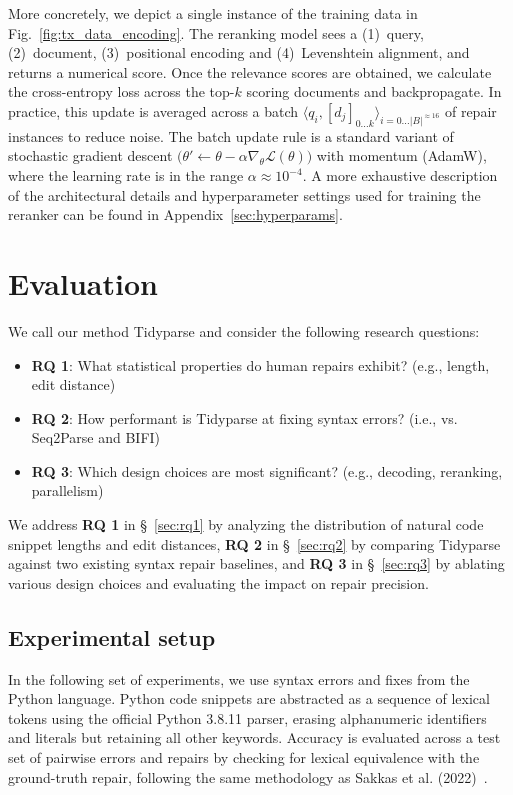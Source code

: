 \documentclass[sigplan,review,acmsmall,nonacm,screen,anonymous]{acmart}\settopmatter{printfolios=false,printccs=false,printacmref=false}
\begin{document}
More concretely, we depict a single instance of the training data in Fig.~\ref{fig:tx_data_encoding}. The reranking model sees a (1)~query, (2)~document, (3)~positional encoding and (4)~Levenshtein alignment, and returns a numerical score. Once the relevance scores are obtained, we calculate the cross-entropy loss across the top-$k$ scoring documents and backpropagate. In practice, this update is averaged across a batch $\langle q_i, [d_j]_{0\ldots k}\rangle_{i=0\ldots |B|^{\approx 16}}$ of repair instances to reduce noise. The batch update rule is a standard variant of stochastic gradient descent $\big(\theta' \leftarrow \theta - \alpha \nabla_{\theta} \mathcal{L}(\theta)\big)$ with momentum (AdamW), where the learning rate is in the range $\alpha\approx10^{-4}$. A more exhaustive description of the architectural details and hyperparameter settings used for training the reranker can be found in Appendix~\ref{sec:hyperparams}.

\clearpage\section{Evaluation}

We call our method Tidyparse and consider the following research questions:

\begin{itemize}
\item \textbf{RQ 1}: What statistical properties do human repairs exhibit? (e.g., length, edit distance)
\item \textbf{RQ 2}: How performant is Tidyparse at fixing syntax errors? (i.e., vs. Seq2Parse and BIFI)
\item \textbf{RQ 3}: Which design choices are most significant? (e.g., decoding, reranking, parallelism)
\end{itemize}

We address \textbf{RQ 1} in \S~\ref{sec:rq1} by analyzing the distribution of natural code snippet lengths and edit distances, \textbf{RQ 2} in \S~\ref{sec:rq2} by comparing Tidyparse against two existing syntax repair baselines, and \textbf{RQ 3} in \S~\ref{sec:rq3} by ablating various design choices and evaluating the impact on repair precision.

\subsection{Experimental setup}

In the following set of experiments, we use syntax errors and fixes from the Python language. Python code snippets are abstracted as a sequence of lexical tokens using the official Python 3.8.11 parser, erasing alphanumeric identifiers and literals but retaining all other keywords. Accuracy is evaluated across a test set of pairwise errors and repairs by checking for lexical equivalence with the ground-truth repair, following the same methodology as Sakkas et al. (2022)~\cite{sakkas2022seq2parse}.
\end{document}
